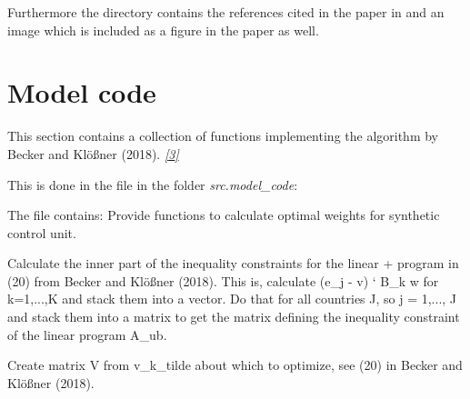\documentclass[a4paper,11pt,english]{sphinxmanual}
\begin{document}
Furthermore the directory contains the references cited in the paper in  and an image which is included as a figure in the paper as well.


\chapter{Model code}
\label{model_code:id1}\label{model_code:model-code}\label{model_code::doc}
This section contains a collection of functions implementing the algorithm by Becker and Klößner (2018). \label{model_code:id2}{\hyperref[references:becker2018]{\emph{{[}3{]}}}}

This is done in the file  in the folder \emph{src.model\_code}:

The file contains:
\label{model_code:module-src.model_code.synth_control_functions}
Provide functions to calculate optimal weights for synthetic control unit.

\begin{fulllineitems}
\label{model_code:src.model_code.synth_control_functions.calculate_inner_part_of_inequ_constr_for_linprog_16}
Calculate the inner part of the inequality constraints for the linear +
program in (20) from Becker and Klößner (2018). This is, calculate
(e\_j - v) ` B\_k  w for k=1,...,K and stack them into a vector. Do that for
all countries J, so j = 1,..., J and stack them into a matrix to get the
matrix defining the inequality constraint of the linear program A\_ub.

\end{fulllineitems}


\begin{fulllineitems}
\label{model_code:src.model_code.synth_control_functions.create_matrix_v_from_v_k_tilde}
Create matrix V from v\_k\_tilde about which to optimize, see (20)
in Becker and Klößner (2018).

\end{fulllineitems}
\end{document}
